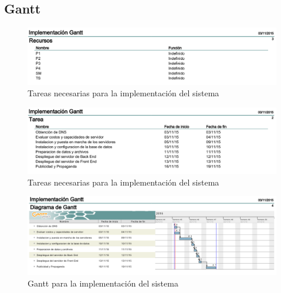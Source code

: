\newpage
\subsection{Gantt}



\begin{figure}
	\centering
	\includegraphics[width=.8\textwidth]{img/recursos_implementacion}
	\caption{Tareas necesarias para la implementación del sistema}
	\label{recursos_implementacion}
\end{figure}


\begin{figure}
	\centering
	\includegraphics[width=.8\textwidth]{img/gantt_implementacion}
	\caption{Tareas necesarias para la implementación del sistema}
	\label{tareas_implementacion}
\end{figure}
\begin{figure}
	\centering
	\includegraphics[width=.8\textwidth]{img/gantt_implementacion2}
	\caption{Gantt para la implementación del sistema}
	\label{gantt_implementacion2}
\end{figure}

